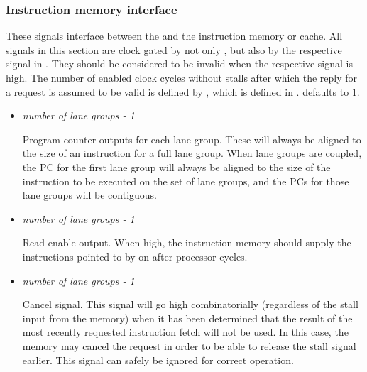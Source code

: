 
\subsubsection{Instruction memory interface}
\label{sec:core-ug-cfg-inst-port-imem}

These signals interface between the \rvex{} and the instruction memory or cache. 
All signals in this section are clock gated by not only , but also 
by the respective signal in . They should be considered to 
be invalid when the respective  signal is high. The number 
of enabled clock cycles without stalls after which the reply for a request is 
assumed to be valid is defined by , which is defined in 
.  defaults to 1.

\begin{itemize}

\item {}\textit{number of lane groups - 1}

Program counter outputs for each lane group. These will always be aligned to the 
size of an instruction for a full lane group. When lane groups are coupled, the 
PC for the first lane group will always be aligned to the size of the 
instruction to be executed on the set of lane groups, and the PCs for those lane 
groups will be contiguous.

\vspace{1em}
\item {}\textit{number of lane groups - 1}

Read enable output. When high, the instruction memory should supply the 
instructions pointed to by  on  after 
 processor cycles.

\vspace{1em}
\item {}\textit{number of lane groups - 1}

Cancel signal. This signal will go high combinatorially (regardless of the stall 
input from the memory) when it has been determined that the result of the most 
recently requested instruction fetch will not be used. In this case, the memory 
may cancel the request in order to be able to release the stall signal earlier. 
This signal can safely be ignored for correct operation.


\end{itemize}
